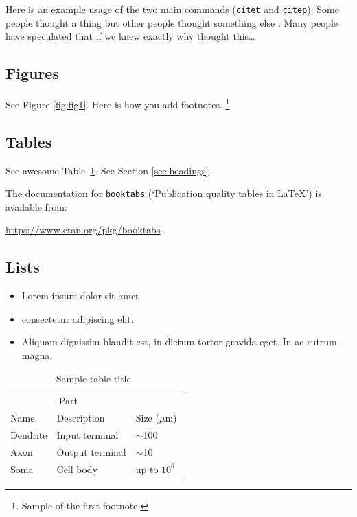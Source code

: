 \documentclass{article}
\begin{document}
Here is an example usage of the two main commands (\verb+citet+ and \verb+citep+): Some people thought a thing \citep{kour2014real, hadash2018estimate} but other people thought something else \citep{kour2014fast}. Many people have speculated that if we knew exactly why \citet{kour2014fast} thought this\dots

\subsection{Figures}
\lipsum[10]
See Figure \ref{fig:fig1}. Here is how you add footnotes. \footnote{Sample of the first footnote.}
\lipsum[11]



\subsection{Tables}
See awesome Table~\ref{tab:table}.
See Section \ref{sec:headings}.

The documentation for \verb+booktabs+ (`Publication quality tables in LaTeX') is available from:
\begin{center}
	\url{https://www.ctan.org/pkg/booktabs}
\end{center}




\subsection{Lists}
\begin{itemize}
	\item Lorem ipsum dolor sit amet
	\item consectetur adipiscing elit.
	\item Aliquam dignissim blandit est, in dictum tortor gravida eget. In ac rutrum magna.
\end{itemize}

\begin{table}
	\caption{Sample table title}
	\centering
	\begin{tabular}{lll}
		\toprule
		\multicolumn{2}{c}{Part}                   \\
		\cmidrule(r){1-2}
		Name     & Description     & Size ($\mu$m) \\
		\midrule
		Dendrite & Input terminal  & $\sim$100     \\
		Axon     & Output terminal & $\sim$10      \\
		Soma     & Cell body       & up to $10^6$  \\
		\bottomrule
	\end{tabular}
	\label{tab:table}
\end{table}



\end{document}
